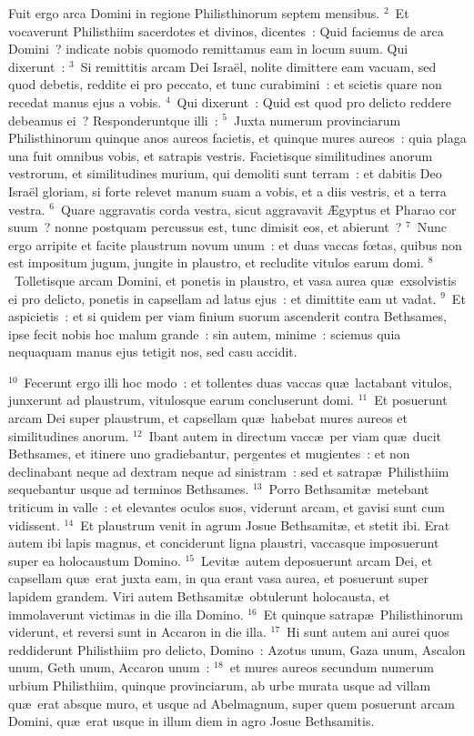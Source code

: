 \lettrine[lines=10,image=true,loversize=0.05,lraise=-0.03]{F}{}uit ergo arca Domini in regione Philisthinorum septem mensibus.
${}^{2}$~Et vocaverunt Philisthiim sacerdotes et divinos, dicentes~: Quid faciemus de arca Domini~? indicate nobis quomodo remittamus eam in locum suum. Qui dixerunt~:
${}^{3}$~Si remittitis arcam Dei Isra\"el, nolite dimittere eam vacuam, sed quod debetis, reddite ei pro peccato, et tunc curabimini~: et scietis quare non recedat manus ejus a vobis.
${}^{4}$~Qui dixerunt~: Quid est quod pro delicto reddere debeamus ei~? Responderuntque illi~:
${}^{5}$~Juxta numerum provinciarum Philisthinorum quinque anos aureos facietis, et quinque mures aureos~: quia plaga una fuit omnibus vobis, et satrapis vestris. Facietisque similitudines anorum vestrorum, et similitudines murium, qui demoliti sunt terram~: et dabitis Deo Isra\"el gloriam, si forte relevet manum suam a vobis, et a diis vestris, et a terra vestra.
${}^{6}$~Quare aggravatis corda vestra, sicut aggravavit \AE gyptus et Pharao cor suum~? nonne postquam percussus est, tunc dimisit eos, et abierunt~?
${}^{7}$~Nunc ergo arripite et facite plaustrum novum unum~: et duas vaccas fœtas, quibus non est impositum jugum, jungite in plaustro, et recludite vitulos earum domi.
${}^{8}$~Tolletisque arcam Domini, et ponetis in plaustro, et vasa aurea qu\ae\ exsolvistis ei pro delicto, ponetis in capsellam ad latus ejus~: et dimittite eam ut vadat.
${}^{9}$~Et aspicietis~: et si quidem per viam finium suorum ascenderit contra Bethsames, ipse fecit nobis hoc malum grande~: sin autem, minime~: sciemus quia nequaquam manus ejus tetigit nos, sed casu accidit.


${}^{10}$~Fecerunt ergo illi hoc modo~: et tollentes duas vaccas qu\ae\ lactabant vitulos, junxerunt ad plaustrum, vitulosque earum concluserunt domi.
${}^{11}$~Et posuerunt arcam Dei super plaustrum, et capsellam qu\ae\ habebat mures aureos et similitudines anorum.
${}^{12}$~Ibant autem in directum vacc\ae\ per viam qu\ae\ ducit Bethsames, et itinere uno gradiebantur, pergentes et mugientes~: et non declinabant neque ad dextram neque ad sinistram~: sed et satrap\ae\ Philisthiim sequebantur usque ad terminos Bethsames.
${}^{13}$~Porro Bethsamit\ae\ metebant triticum in valle~: et elevantes oculos suos, viderunt arcam, et gavisi sunt cum vidissent.
${}^{14}$~Et plaustrum venit in agrum Josue Bethsamit\ae , et stetit ibi. Erat autem ibi lapis magnus, et conciderunt ligna plaustri, vaccasque imposuerunt super ea holocaustum Domino.
${}^{15}$~Levit\ae\ autem deposuerunt arcam Dei, et capsellam qu\ae\ erat juxta eam, in qua erant vasa aurea, et posuerunt super lapidem grandem. Viri autem Bethsamit\ae\ obtulerunt holocausta, et immolaverunt victimas in die illa Domino.
${}^{16}$~Et quinque satrap\ae\ Philisthinorum viderunt, et reversi sunt in Accaron in die illa.
${}^{17}$~Hi sunt autem ani aurei quos reddiderunt Philisthiim pro delicto, Domino~: Azotus unum, Gaza unum, Ascalon unum, Geth unum, Accaron unum~:
${}^{18}$~et mures aureos secundum numerum urbium Philisthiim, quinque provinciarum, ab urbe murata usque ad villam qu\ae\ erat absque muro, et usque ad Abelmagnum, super quem posuerunt arcam Domini, qu\ae\ erat usque in illum diem in agro Josue Bethsamitis.


